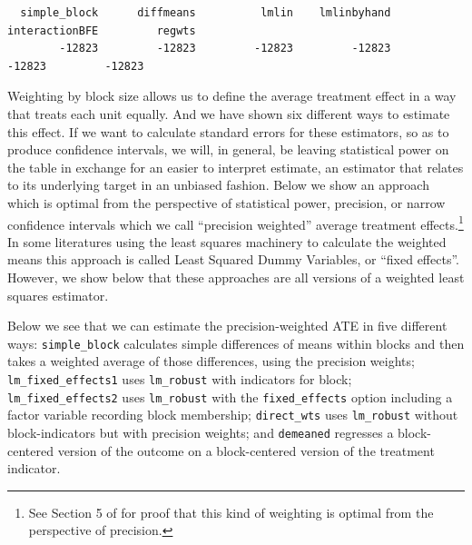 \documentclass[
  12pt,
]{book}
\newenvironment{Shaded}{\begin{snugshade}}{\end{snugshade}}
\newcommand{\DocumentationTok}[1]{\textcolor[rgb]{0.56,0.35,0.01}{\textbf{\textit{#1}}}}
\theoremstyle{definition}
\theoremstyle{definition}
\theoremstyle{definition}
\theoremstyle{remark}
\begin{document}
\begin{verbatim}
  simple_block      diffmeans          lmlin    lmlinbyhand interactionBFE         regwts 
        -12823         -12823         -12823         -12823         -12823         -12823 
\end{verbatim}

\begin{Shaded}
\end{Shaded}

Weighting by block size allows us to define the average treatment effect
in a way that treats each unit equally. And we have shown six different
ways to estimate this effect. If we want to calculate standard errors
for these estimators, so as to produce confidence intervals, we will, in
general, be leaving statistical power on the table in exchange for an
easier to interpret estimate, an estimator that relates to its
underlying target in an unbiased fashion. Below we show an approach
which is optimal from the perspective of statistical power, precision,
or narrow confidence intervals which we call ``precision weighted''
average treatment effects.\footnote{See Section 5 of
  \citet{hansen_covariate_2008} for proof that this kind of weighting is
  optimal from the perspective of precision.} In some literatures using
the least squares machinery to calculate the weighted means this
approach is called Least Squared Dummy Variables, or ``fixed effects''.
However, we show below that these approaches are all versions of a
weighted least squares estimator.

Below we see that we can estimate the precision-weighted ATE in five
different ways: \texttt{simple\_block} calculates simple differences of
means within blocks and then takes a weighted average of those
differences, using the precision weights; \texttt{lm\_fixed\_effects1}
uses \texttt{lm\_robust} with indicators for block;
\texttt{lm\_fixed\_effects2} uses \texttt{lm\_robust} with the
\texttt{fixed\_effects} option including a factor variable recording
block membership; \texttt{direct\_wts} uses \texttt{lm\_robust} without
block-indicators but with precision weights; and \texttt{demeaned}
regresses a block-centered version of the outcome on a block-centered
version of the treatment indicator.
\end{document}
